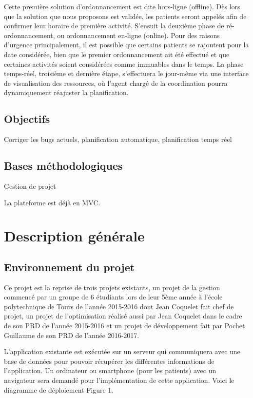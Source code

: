 \documentclass{polytech/polytech}
\begin{document}
Cette première solution d'ordonnancement est dite hors-ligne (offline). Dès lors que la solution que nous proposons est validée, les patients seront appelés afin de confirmer leur horaire de première activité. S'ensuit la deuxième phase de ré-ordonnancement, ou ordonnancement en-ligne (online). Pour des raisons d'urgence principalement, il est possible que certains patients se rajoutent pour la date considérée, bien que le premier ordonnancement ait été effectué et que certaines activités soient considérées comme immuables dans le temps. La phase temps-réel, troisième et dernière étape, s'effectuera le jour-même via une interface de visualisation des ressources, où l'agent chargé de la coordination pourra dynamiquement réajuster la planification.


\section{Objectifs}


Corriger les bugs actuels, planification automatique, planification temps réel


\section{Bases méthodologiques}


Gestion de projet


La plateforme est déjà en MVC.


\chapter{Description générale}


\section{Environnement du projet}


Ce projet est la reprise de trois projets existants, un projet de la gestion commencé par un groupe de 6 étudiants lors de leur 5ème année à l'école polytechnique de Tours de l'année 2015-2016 dont Jean Coquelet fait chef de projet, un projet de l'optimisation réalisé aussi par Jean Coquelet dans le cadre de son PRD de l'année 2015-2016 et un projet de développement fait par Pochet Guillaume de son PRD de l'année 2016-2017.

L'application existante est exécutée sur un serveur qui communiquera avec une base de données pour pouvoir récupérer les différentes informations de l'application. Un ordinateur ou smartphone (pour les patients) avec un navigateur sera demandé pour l'implémentation de cette application. Voici le diagramme de déploiement Figure 1. 
\end{document}
